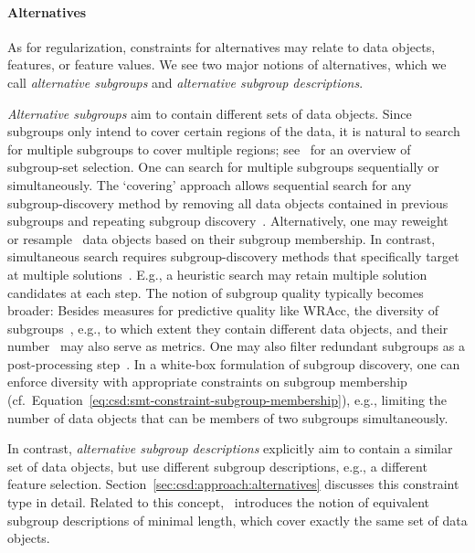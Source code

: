 \documentclass{article}
\theoremstyle{definition}
\begin{document}
\paragraph{Alternatives}

As for regularization, constraints for alternatives may relate to data objects, features, or feature values.
We see two major notions of alternatives, which we call \emph{alternative subgroups} and \emph{alternative subgroup descriptions}.

\emph{Alternative subgroups} aim to contain different sets of data objects.
Since subgroups only intend to cover certain regions of the data, it is natural to search for multiple subgroups to cover multiple regions; see~\cite{atzmueller2015subgroup} for an overview of subgroup-set selection.
One can search for multiple subgroups sequentially or simultaneously.
The `covering' approach allows sequential search for any subgroup-discovery method by removing all data objects contained in previous subgroups and repeating subgroup discovery~\cite{friedman1999bump}.
Alternatively, one may reweight~\cite{gamberger2002expert, lavrac2004subgroup} or resample~\cite{scholz2005sampling} data objects based on their subgroup membership.
In contrast, simultaneous search requires subgroup-discovery methods that specifically target at multiple solutions~\cite{leeuwen2012diverse, leeuwen2013discovering, lemmerich2010fast, lucas2018ssdp+, proencca2022robust}.
E.g., a heuristic search may retain multiple solution candidates at each step.
The notion of subgroup quality typically becomes broader:
Besides measures for predictive quality like WRAcc, the diversity of subgroups~\cite{belfodil2019fssd, leeuwen2012diverse, leeuwen2013discovering, lucas2018ssdp+}, e.g., to which extent they contain different data objects, and their number~\cite{helal2016subgroup, herrera2011overview, ventura2018subgroup} may also serve as metrics.
One may also filter redundant subgroups as a post-processing step~\cite{bosc2018anytime, grosskreutz2012enhanced, hudson2023subgroup, leeuwen2013discovering}.
In a white-box formulation of subgroup discovery, one can enforce diversity with appropriate constraints on subgroup membership (cf.~Equation~\ref{eq:csd:smt-constraint-subgroup-membership}), e.g., limiting the number of data objects that can be members of two subgroups simultaneously.

In contrast, \emph{alternative subgroup descriptions} explicitly aim to contain a similar set of data objects, but use different subgroup descriptions, e.g., a different feature selection.
Section~\ref{sec:csd:approach:alternatives} discusses this constraint type in detail.
Related to this concept, \cite{boley2009non}~introduces the notion of equivalent subgroup descriptions of minimal length, which cover exactly the same set of data objects.
\end{document}
